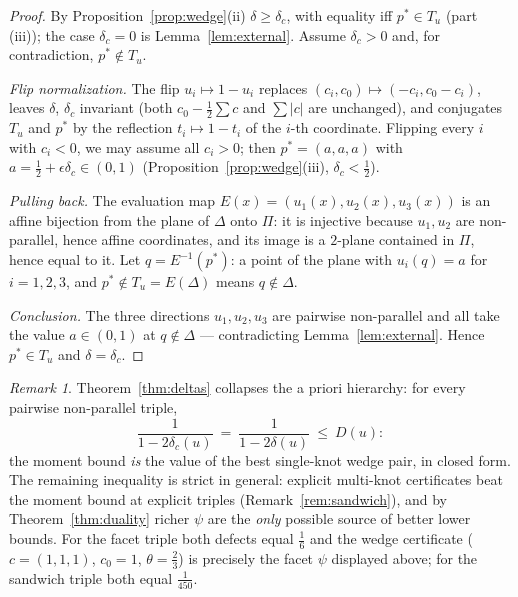 \documentclass[11pt,reqno]{amsart}
\theoremstyle{plain}
\theoremstyle{definition}
\theoremstyle{remark}
\newtheorem{remark}[theorem]{Remark}
\begin{document}
\begin{proof}
By Proposition~\ref{prop:wedge}(ii) $\delta\ge\delta_c$, with equality iff
$p^\ast\in T_u$ (part (iii)); the case $\delta_c=0$ is
Lemma~\ref{lem:external}. Assume $\delta_c>0$ and, for contradiction,
$p^\ast\notin T_u$.

\emph{Flip normalization.} The flip $u_i\mapsto1-u_i$ replaces
$(c_i,c_0)\mapsto(-c_i,c_0-c_i)$, leaves $\delta$, $\delta_c$ invariant
(both $c_0-\tfrac12\sum c$ and $\sum|c|$ are unchanged), and conjugates
$T_u$ and $p^\ast$ by the reflection $t_i\mapsto1-t_i$ of the $i$-th
coordinate. Flipping every $i$ with $c_i<0$, we may assume all $c_i>0$;
then $p^\ast=(a,a,a)$ with
$a=\tfrac12+\epsilon\delta_c\in(0,1)$ (Proposition~\ref{prop:wedge}(iii),
$\delta_c<\tfrac12$).

\emph{Pulling back.} The evaluation map $E(x)=(u_1(x),u_2(x),u_3(x))$ is an
affine bijection from the plane of $\Delta$ onto $\Pi$: it is injective
because $u_1,u_2$ are non-parallel, hence affine coordinates, and its image
is a $2$-plane contained in $\Pi$, hence equal to it. Let
$q=E^{-1}(p^\ast)$: a point of the plane with $u_i(q)=a$ for $i=1,2,3$, and
$p^\ast\notin T_u=E(\Delta)$ means $q\notin\Delta$.

\emph{Conclusion.} The three directions $u_1,u_2,u_3$ are pairwise
non-parallel and all take the value $a\in(0,1)$ at $q\notin\Delta$ ---
contradicting Lemma~\ref{lem:external}. Hence $p^\ast\in T_u$ and
$\delta=\delta_c$.
\end{proof}

\begin{remark}\label{rem:wedgemoment}
Theorem~\ref{thm:deltas} collapses the a priori hierarchy: for every
pairwise non-parallel triple,
\[
\frac1{1-2\delta_c(u)}\ =\ \frac1{1-2\delta(u)}\ \le\ D(u):
\]
the moment bound \emph{is} the value of the best single-knot wedge pair, in
closed form. The remaining inequality is strict in general: explicit
multi-knot certificates beat the moment bound at explicit triples
(Remark~\ref{rem:sandwich}), and by Theorem~\ref{thm:duality} richer $\psi$
are the \emph{only} possible source of better lower bounds. For the facet
triple both defects equal $\tfrac16$ and the wedge certificate ($c=(1,1,1)$,
$c_0=1$, $\theta=\tfrac23$) is precisely the facet $\psi$ displayed above;
for the sandwich triple both equal $\tfrac1{450}$.
\end{remark}
\end{document}
